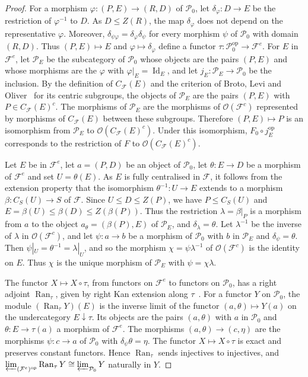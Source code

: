 \documentclass[10pt]{amsart}
\theoremstyle{definition}
\numberwithin{equation}{section}
\renewcommand{\le}{\leqslant}
\newcommand{\F}{\mathcal F}
\newcommand{\Op}{\mathcal O}
\begin{document}
\begin{proof}
For a morphism $\varphi\colon(P,E)\to(R,D)$ of $\mathcal P_0$, let $\delta_\varphi\colon D\to E$ be the restriction of $\varphi^{-1}$ to $D$. As $D\le Z(R)$, the map $\delta_\varphi$ does not depend on the representative $\varphi$. Moreover, $\delta_{\psi\varphi}=\delta_\varphi\delta_\psi$ for every morphism $\psi$ of $\mathcal P_0$ with domain $(R,D)$. Thus $(P,E)\mapsto E$ and $\varphi\mapsto\delta_\varphi$ define a functor $\tau\colon\mathcal P_0^{\mathrm{op}}\to\F^e$. For $E$ in $\F^e$, let $\mathcal P_E$ be the subcategory of $\mathcal P_0$ whose objects are the pairs $(P,E)$ and whose morphisms are the $\varphi$ with $\varphi|_E=\operatorname{Id}_E$, and let $j_E\colon\mathcal P_E\to\mathcal P_0$ be the inclusion. By the definition of $C_\F(E)$ and the criterion of Broto, Levi and Oliver~\cite[Proposition~2.5(a)]{BLO} for its centric subgroups, the objects of $\mathcal P_E$ are the pairs $(P,E)$ with $P\in C_\F(E)^c$. The morphisms of $\mathcal P_E$ are the morphisms of $\Op(\F^c)$ represented by morphisms of $C_\F(E)$ between these subgroups. Therefore $(P,E)\mapsto P$ is an isomorphism from $\mathcal P_E$ to $\Op(C_\F(E)^c)$. Under this isomorphism, $F_0\circ j_E^{\mathrm{op}}$ corresponds to the restriction of $F$ to $\Op(C_\F(E)^c)$.

Let $E$ be in $\F^e$, let $a=(P,D)$ be an object of $\mathcal P_0$, let $\theta\colon E\to D$ be a morphism of $\F^e$ and set $U=\theta(E)$. As $E$ is fully centralised in $\F$, it follows from the extension property that the isomorphism $\theta^{-1}\colon U\to E$ extends to a morphism $\beta\colon C_S(U)\to S$ of $\F$. Since $U\le D\le Z(P)$, we have $P\le C_S(U)$ and $E=\beta(U)\le\beta(D)\le Z(\beta(P))$. Thus the restriction $\lambda=\beta|_P$ is a morphism from $a$ to the object $a_\theta=(\beta(P),E)$ of $\mathcal P_E$, and $\delta_\lambda=\theta$. Let $\lambda^{-1}$ be the inverse of $\lambda$ in $\Op(\F^c)$, and let $\psi\colon a\to b$ be a morphism of $\mathcal P_0$ with $b$ in $\mathcal P_E$ and $\delta_\psi=\theta$. Then $\psi|_U=\theta^{-1}=\lambda|_U$, and so the morphism $\chi=\psi\lambda^{-1}$ of $\Op(\F^c)$ is the identity on $E$. Thus $\chi$ is the unique morphism of $\mathcal P_E$ with $\psi=\chi\lambda$.

The functor $X\mapsto X\circ\tau$, from functors on $\F^e$ to functors on $\mathcal P_0$, has a right adjoint $\operatorname{Ran}_\tau$, given by right Kan extension along $\tau$~\cite[X.3, Theorem~1 and Corollary~2]{MacLane}. For a functor $Y$ on $\mathcal P_0$, the module $(\operatorname{Ran}_\tau Y)(E)$ is the inverse limit of the functor $(a,\theta)\mapsto Y(a)$ on the undercategory $E\downarrow\tau$. Its objects are the pairs $(a,\theta)$ with $a$ in $\mathcal P_0$ and $\theta\colon E\to\tau(a)$ a morphism of $\F^e$. The morphisms $(a,\theta)\to(c,\eta)$ are the morphisms $\psi\colon c\to a$ of $\mathcal P_0$ with ${\delta_\psi\theta=\eta}$. The functor $X\mapsto X\circ\tau$ is exact and preserves constant functors. Hence $\operatorname{Ran}_\tau$ sends injectives to injectives, and $\varprojlim_{(\F^e)^{\mathrm{op}}}\operatorname{Ran}_\tau Y\cong\varprojlim_{\mathcal P_0}Y$ naturally in $Y$.


\end{proof}
\end{document}
